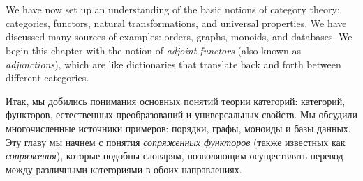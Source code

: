 \documentclass[../main/CT4S-EN-RU]{subfiles}
\begin{document}
\section*{}

\begin{blockENG}
We have now set up an understanding of the basic notions of category theory: categories, functors, natural transformations, and universal properties. We have discussed many sources of examples: orders, graphs, monoids, and databases. We begin this chapter with the notion of {\em adjoint functors} (also known as {\em adjunctions}), which are like dictionaries that translate back and forth between different categories. 
\end{blockENG}

\begin{blockRUS}
Итак, мы добились понимания основных понятий теории категорий: категорий, функторов, естественных преобразований и универсальных свойств. Мы обсудили многочисленные источники примеров: порядки, графы, моноиды и базы данных. Эту главу мы начнем с понятия {\em сопряженных функторов} (также известных как {\em сопряжения}), которые подобны словарям, позволяющим осуществлять перевод между различными категориями в обоих направлениях. 
\end{blockRUS}
\end{document}
